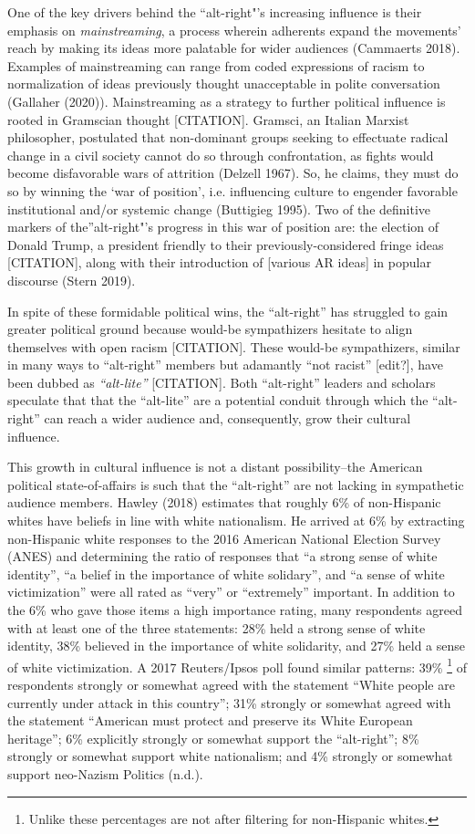 \documentclass[acmlarge, screen, authorversion]{acmart}
\begin{document}
One of the key drivers behind the “alt-right"’s increasing influence is their
emphasis on \textit{mainstreaming}, a process wherein adherents expand the
movements’ reach by making its ideas more palatable for wider audiences
(Cammaerts 2018). Examples of mainstreaming can range from coded
expressions of racism to normalization of ideas previously thought
unacceptable in polite conversation (Gallaher (2020)). Mainstreaming as a
strategy to further political influence is rooted in Gramscian thought
[CITATION]. Gramsci, an Italian Marxist philosopher, postulated that
non-dominant groups seeking to effectuate radical change in a civil
society cannot do so through confrontation, as fights would become
disfavorable wars of attrition (Delzell 1967). So, he claims, they must
do so by winning the ‘war of position’, i.e. influencing culture to
engender favorable institutional and/or systemic change (Buttigieg
1995). Two of the definitive markers of the”alt-right"’s progress in
this war of position are: the election of Donald Trump, a president
friendly to their previously-considered fringe ideas [CITATION], along
with their introduction of [various AR ideas] in popular discourse
(Stern 2019).

In spite of these formidable political wins, the “alt-right” has
struggled to gain greater political ground because would-be sympathizers
hesitate to align themselves with open racism [CITATION]. These would-be
sympathizers, similar in many ways to “alt-right” members but adamantly
``not racist” [edit?], have been dubbed as \textit{``alt-lite”} [CITATION].
Both ``alt-right'' leaders and scholars speculate that that the ``alt-lite''
are a potential conduit through which the “alt-right” can reach a wider
audience and, consequently, grow their cultural influence.

This growth in cultural influence is not a distant possibility–the
American political state-of-affairs is such that the “alt-right” are not lacking in sympathetic audience members. Hawley (2018) estimates that roughly 6\% of
non-Hispanic whites have beliefs in line with white nationalism. He
arrived at 6\% by extracting non-Hispanic white responses to the 2016
American National Election Survey (ANES) and determining the ratio of
responses that “a strong sense of white identity”, “a belief in the
importance of white solidary”, and “a sense of white victimization” were
all rated as “very” or “extremely” important. In addition to the 6\% who
gave those items a high importance rating, many respondents agreed with
at least one of the three statements: 28\% held a strong sense of white
identity, 38\% believed in the importance of white solidarity, and 27\%
held a sense of white victimization. A 2017 Reuters/Ipsos poll found
similar patterns: 39\% \footnote{Unlike \citet{hawleyDemographyAltRight2018} these percentages are not after
filtering for non-Hispanic whites.} of respondents strongly or somewhat
agreed with the statement “White people are currently under attack in
this country”; 31\% strongly or somewhat agreed with the statement
“American must protect and preserve its White European heritage”; 6\%
explicitly strongly or somewhat support the “alt-right”; 8\% strongly or
somewhat support white nationalism; and 4\% strongly or somewhat support
neo-Nazism Politics (n.d.).
\end{document}
